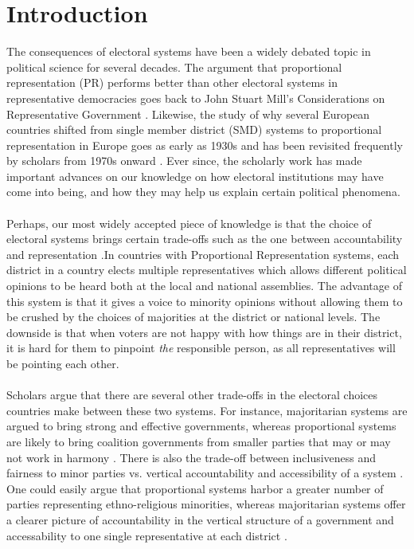 \documentclass{article}
\begin{document}
\section{Introduction}
The consequences of electoral systems have been a widely debated topic in political science for several decades. The argument that proportional representation (PR) performs better than other electoral systems in representative democracies goes back to John Stuart Mill's Considerations on  Representative Government \cite{mill1861considerations}. Likewise, the study of why several European countries shifted from single member district (SMD) systems to proportional representation in Europe goes as early as 1930s \cite{braunias1932parlamentarische} and has been revisited frequently by scholars from 1970s onward \cite{rokkan_citizens_1970, boix_setting_1999, cusack_economic_2007}. Ever since, the scholarly work has made important advances on our knowledge on how electoral institutions may have come into being, and how they may help us explain certain political phenomena.\\

\\
Perhaps, our most widely accepted piece of knowledge is that the choice of electoral systems brings certain trade-offs such as the one between accountability and representation \cite{diamond1999developing,carey_electoral_2011,persson_economic_2003,britain1998report}.In countries with Proportional Representation systems, each district in a country elects multiple representatives which allows different political opinions to be heard both at the local and national assemblies. The advantage of this system is that it gives a voice to minority opinions without allowing them to be crushed by the choices of majorities at the district or national levels. The downside is that when voters are not happy with how things are in their district, it is hard for them to pinpoint \textit{the} responsible person, as all representatives will be pointing each other. \\
\\
Scholars argue that there are several other trade-offs in the electoral choices countries make between these two systems. For instance, majoritarian systems are argued to bring strong and effective governments, whereas proportional systems are likely to bring coalition governments from smaller parties that may or may not work in harmony \cite{norris1997choosing}. There is also the trade-off between inclusiveness and fairness to minor parties vs. vertical accountability and accessibility of a system \cite{norris1997choosing, diamond1999developing}. One could easily argue that proportional systems harbor a greater number of parties representing ethno-religious minorities, whereas majoritarian systems offer a clearer picture of accountability in the vertical structure of a government and accessability to one single representative at each district \cite{norris1997choosing, diamond1999developing}. \\
\end{document}
